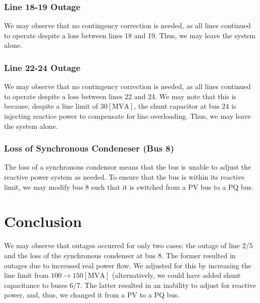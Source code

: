 \documentclass[
	letterpaper, %
	10pt, %
]{CSUniSchoolLabReport}
\begin{document}
\subsubsection{Line 18-19 Outage}


We may observe that no contingency correction is needed, as all lines continued to operate despite a loss between lines 18 and 19. Thus, we may leave the system alone.

\subsubsection{Line 22-24 Outage}


We may observe that no contingency correction is needed, as all lines continued to operate despite a loss between lines 22 and 24. We may note that this is because, despite a line limit of $30[\si{\mega\volt\ampere}]$, the shunt capacitor at bus 24 is injecting reactice power to compensate for line overloading. Thus, we may leave the system alone.

\subsubsection{Loss of Synchronous Condeneser (Bus 8)}


The loss of a synchronous condensor means that the bus is unable to adjust the reactive power system as needed. To ensure that the bus is within its reactive limit, we may modify bus 8 such that it is switched from a PV bus to a PQ bus.

\section{Conclusion}

We may observe that outages occurred for only two cases: the outage of line 2/5 and the loss of the synchronous condenser at bus 8. The former resulted in outages due to increased real power flow. We adjusted for this by increasing the line limit from $100\to150[\si{\mega\volt\ampere}]$ (alternatively, we could have added shunt capacitance to buses 6/7. The latter resulted in an inability to adjust for reactive power, and, thus, we changed it from a PV to a PQ bus.
\end{document}
